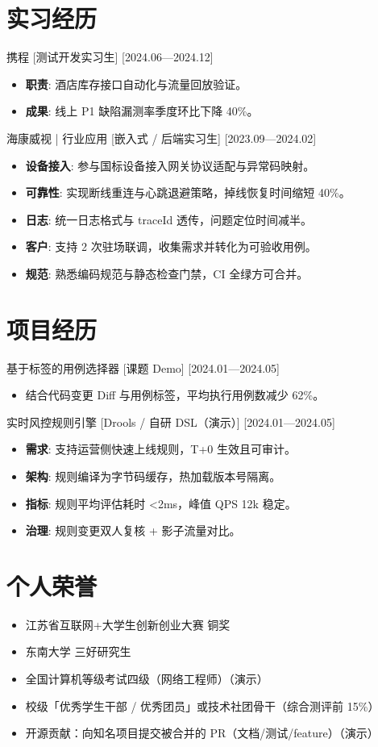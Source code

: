 \documentclass{resume-photo}
\begin{document}
\section{实习经历}
\ResumeItem
{携程}
[\textnormal{测试开发实习生}]
[2024.06—2024.12]

\begin{itemize}
  \item \textbf{职责}: 酒店库存接口自动化与流量回放验证。
  \item \textbf{成果}: 线上 P1 缺陷漏测率季度环比下降 40\%。
\end{itemize}


\ResumeItem
{海康威视 | 行业应用}
[\textnormal{嵌入式 / 后端实习生}]
[2023.09—2024.02]

\begin{itemize}
  \item \textbf{设备接入}: 参与国标设备接入网关协议适配与异常码映射。
  \item \textbf{可靠性}: 实现断线重连与心跳退避策略，掉线恢复时间缩短 40\%。
  \item \textbf{日志}: 统一日志格式与 traceId 透传，问题定位时间减半。
  \item \textbf{客户}: 支持 2 次驻场联调，收集需求并转化为可验收用例。
  \item \textbf{规范}: 熟悉编码规范与静态检查门禁，CI 全绿方可合并。
\end{itemize}



\section{项目经历}
\ResumeItem
{基于标签的用例选择器}
[\textnormal{课题 Demo}]
[2024.01—2024.05]

\begin{itemize}
  \item 结合代码变更 Diff 与用例标签，平均执行用例数减少 62\%。
\end{itemize}


\ResumeItem
{实时风控规则引擎}
[\textnormal{Drools / 自研 DSL（演示）}]
[2024.01—2024.05]

\begin{itemize}
  \item \textbf{需求}: 支持运营侧快速上线规则，T+0 生效且可审计。
  \item \textbf{架构}: 规则编译为字节码缓存，热加载版本号隔离。
  \item \textbf{指标}: 规则平均评估耗时 <2ms，峰值 QPS 12k 稳定。
  \item \textbf{治理}: 规则变更双人复核 + 影子流量对比。
\end{itemize}



\section{个人荣誉}
\begin{itemize}
  \item 江苏省互联网+大学生创新创业大赛 铜奖
  \item 东南大学 三好研究生
  \item 全国计算机等级考试四级（网络工程师）（演示）
  \item 校级「优秀学生干部 / 优秀团员」或技术社团骨干（综合测评前 15\%）
  \item 开源贡献：向知名项目提交被合并的 PR（文档/测试/feature）（演示）
\end{itemize}
\end{document}
